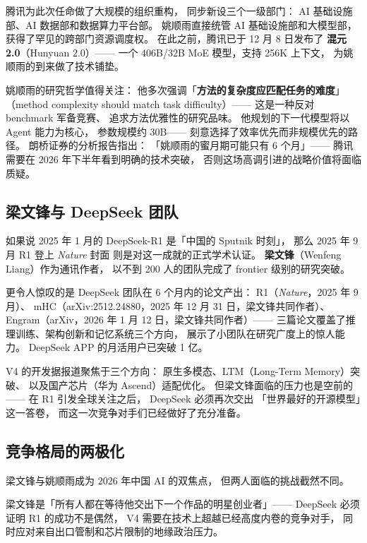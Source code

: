 腾讯为此次任命做了大规模的组织重构，
同步新设三个一级部门：
AI 基础设施部、AI 数据部和数据算力平台部。
姚顺雨直接统管 AI 基础设施部和大模型部，
获得了罕见的跨部门资源调度权。
在此之前，腾讯已于 12 月 8 日发布了
\textbf{混元 2.0}（Hunyuan 2.0）——
一个 406B/32B MoE 模型，支持 256K 上下文，
为姚顺雨的到来做了技术铺垫。

姚顺雨的研究哲学值得关注：
他多次强调「\textbf{方法的复杂度应匹配任务的难度}」
（method complexity should match task difficulty）——
这是一种反对 benchmark 军备竞赛、
追求方法优雅性的研究品味。
他规划的下一代模型将以 Agent 能力为核心，
参数规模约 30B——
刻意选择了效率优先而非规模优先的路径。
朗桥证券的分析报告指出：
「姚顺雨的蜜月期可能只有 6 个月」——
腾讯需要在 2026 年下半年看到明确的技术突破，
否则这场高调引进的战略价值将面临质疑。

\subsection{梁文锋与 DeepSeek 团队}

如果说 2025 年 1 月的 DeepSeek-R1 是「中国的 Sputnik 时刻」，
那么 2025 年 9 月 R1 登上 \textit{Nature} 封面
则是对这一成就的正式学术认证。
\textbf{梁文锋}（Wenfeng Liang）作为通讯作者，
以不到 200 人的团队完成了 frontier 级别的研究突破。

更令人惊叹的是 DeepSeek 团队在 6 个月内的论文产出：
R1（\textit{Nature}，2025 年 9 月）、
mHC（arXiv:2512.24880，2025 年 12 月 31 日，梁文锋共同作者）、
Engram（arXiv，2026 年 1 月 12 日，梁文锋共同作者）——
三篇论文覆盖了推理训练、架构创新和记忆系统三个方向，
展示了小团队在研究广度上的惊人能力。
DeepSeek APP 的月活用户已突破 1 亿。

V4 的开发据报道聚焦于三个方向：
原生多模态、LTM（Long-Term Memory）突破、
以及国产芯片（华为 Ascend）适配优化。
但梁文锋面临的压力也是空前的——
在 R1 引发全球关注之后，
DeepSeek 必须再次交出
「世界最好的开源模型」这一答卷，
而这一次竞争对手们已经做好了充分准备。

\subsection{竞争格局的两极化}

梁文锋与姚顺雨成为 2026 年中国 AI 的双焦点，
但两人面临的挑战截然不同。

梁文锋是「所有人都在等待他交出下一个作品的明星创业者」——
DeepSeek 必须证明 R1 的成功不是偶然，
V4 需要在技术上超越已经高度内卷的竞争对手，
同时应对来自出口管制和芯片限制的地缘政治压力。

